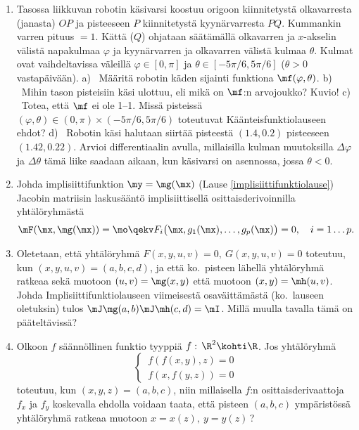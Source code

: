 \begin{enumerate}
\item
Tasossa liikkuvan robotin käsivarsi koostuu origoon kiinnitetystä olkavarresta (janasta)
$OP$ ja pisteeseen $P$ kiinnitetystä kyynärvarresta $PQ$. Kummankin varren pituus $=1$.
Kättä ($Q$) ohjataan säätämällä olkavarren ja $x$-akselin välistä napakulmaa $\varphi$ ja
kyynärvarren ja olkavarren välistä kulmaa $\theta$. Kulmat ovat vaihdeltavissa väleillä 
$\varphi\in[0,\pi]$ ja $\theta\in[-5\pi/6,5\pi/6]$ ($\theta>0$ vastapäivään).
\vspace{1mm}\newline
a) \ Määritä robotin käden sijainti funktiona $\mf(\varphi,\theta)$. \newline
b) \ Mihin tason pisteisiin käsi ulottuu, eli mikä on $\mf$:n arvojoukko? 
     Kuvio! \newline
c) \ Totea, että $\mf$ ei ole 1--1. Missä pisteissä 
     $(\varphi,\theta)\in(0,\pi)\times(-5\pi/6,5\pi/6)$ toteutuvat
     Käänteisfunktiolauseen ehdot? \newline
d) \ Robotin käsi halutaan siirtää pisteestä $(1.4,0.2)$ pisteeseen $(1.42,0.22)$.
     Arvioi differentiaalin avulla, millaisilla kulman muutoksilla $\Delta\varphi$
     ja $\Delta\theta$ tämä liike saadaan aikaan, kun käsivarsi on asennossa, jossa
     $\theta<0$.

\item \label{H-udif-7: implisiittifunktion derivoimissääntö}
Johda implisiittifunktion $\my=\mg(\mx)$ (Lause \ref{implisiittifunktiolause}) Jacobin
matriisin laskusääntö implisiittisellä osittaisderivoinnilla yhtälöryhmästä
\[
\mF(\mx,\mg(\mx))=\mo \qekv F_i\bigl(\mx,g_1(\mx),\ldots,g_p(\mx)\bigr)=0,\quad i = 1 \ldots p.
\]

\item
Oletetaan, että yhtälöryhmä $F(x,y,u,v)=0,\ G(x,y,u,v)=0$ toteutuu, kun $(x,y,u,v)=(a,b,c,d)$,
ja että ko.\ pisteen lähellä yhtälöryhmä ratkeaa sekä muotoon $(u,v)=\mg(x,y)$ että muotoon
$(x,y)=\mh(u,v)$. Johda Implisiittifunktiolauseen viimeisestä osaväittämästä (ko.\ lauseen
oletuksin) tulos $\mJ\mg(a,b)\mJ\mh(c,d)=\mI$. Millä muulla tavalla tämä on pääteltävissä?

\item
Olkoon $f$ säännöllinen funktio tyyppiä $f:\,\R^2\kohti\R$. Jos yhtälöryhmä
\[
\begin{cases} \, f(f(x,y),z)=0 \\ \,f(x,f(y,z))=0 \end{cases}
\]
toteutuu, kun $(x,y,z)=(a,b,c)$, niin millaisella $f$:n osittaisderivaattoja $f_x$ ja $f_y$
koskevalla ehdolla voidaan taata, että pisteen $(a,b,c)$ ympäristössä yhtälöryhmä ratkeaa
muotoon $x=x(z),\ y=y(z)$\,? 


\end{enumerate}
